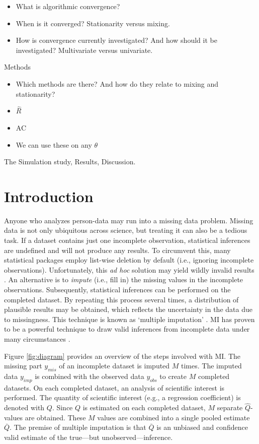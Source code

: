 \documentclass[Royal,times,sageh]{sagej}
\begin{document}
\begin{itemize}
\item
  What is algorithmic convergence?
\item
  When is it converged? Stationarity versus mixing.
\item
  How is convergence currently investigated? And how should it be investigated? Multivariate versus univariate.
\end{itemize}

Methods

\begin{itemize}
\item
  Which methods are there? And how do they relate to mixing and stationarity?
\item
  \(\widehat{R}\)
\item
  AC
\item
  We can use these on any \(\theta\)
\end{itemize}

The Simulation study, Results, Discussion.

\hypertarget{introduction}{%
\section{Introduction}\label{introduction}}

Anyone who analyzes person-data may run into a missing data problem. Missing data is not only ubiquitous across science, but treating it can also be a tedious task. If a dataset contains just one incomplete observation, statistical inferences are undefined and will not produce any results. To circumvent this, many statistical packages employ list-wise deletion by default (i.e., ignoring incomplete observations). Unfortunately, this \emph{ad hoc} solution may yield wildly invalid results \citep{buur18}. An alternative is to \emph{impute} (i.e., fill in) the missing values in the incomplete observations. Subsequently, statistical inferences can be performed on the completed dataset. By repeating this process several times, a distribution of plausible results may be obtained, which reflects the uncertainty in the data due to missingness. This technique is known as `multiple imputation' \citep[MI;][]{rubin76}. MI has proven to be a powerful technique to draw valid inferences from incomplete data under many circumstances \citep{buur18}.

Figure \ref{fig:diagram} provides an overview of the steps involved with MI. The missing part \(y_{mis}\) of an incomplete dataset is imputed \(M\) times. The imputed data \(y_{imp}\) is combined with the observed data \(y_{obs}\) to create \(M\) completed datasets. On each completed dataset, an analysis of scientific interest is performed. The quantity of scientific interest (e.g., a regression coefficient) is denoted with \(Q\). Since \(Q\) is estimated on each completed dataset, \(M\) separate \(\hat{Q}\)-values are obtained. These \(M\) values are combined into a single pooled estimate \(\bar{Q}\). The premise of multiple imputation is that \(\bar{Q}\) is an unbiased and confidence valid estimate of the true---but unobserved---inference.
\end{document}
